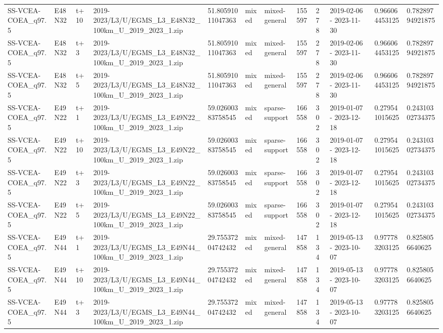 \begin{landscape}
\begin{longtable}{llllllllllll}
SS-VCEA-COEA\_q97.5 & E48N32 & t+10 & 2019-2023/L3/U/EGMS\_L3\_E48N32\_100km\_U\_2019\_2023\_1.zip & 51.80591011047363 & mixed & mixed-general & 155597 & 278 & 2019-02-06 - 2023-11-30 & 0.966064453125 & 0.78289794921875 \\
SS-VCEA-COEA\_q97.5 & E48N32 & t+3 & 2019-2023/L3/U/EGMS\_L3\_E48N32\_100km\_U\_2019\_2023\_1.zip & 51.80591011047363 & mixed & mixed-general & 155597 & 278 & 2019-02-06 - 2023-11-30 & 0.966064453125 & 0.78289794921875 \\
SS-VCEA-COEA\_q97.5 & E48N32 & t+5 & 2019-2023/L3/U/EGMS\_L3\_E48N32\_100km\_U\_2019\_2023\_1.zip & 51.80591011047363 & mixed & mixed-general & 155597 & 278 & 2019-02-06 - 2023-11-30 & 0.966064453125 & 0.78289794921875 \\
SS-VCEA-COEA\_q97.5 & E49N22 & t+1 & 2019-2023/L3/U/EGMS\_L3\_E49N22\_100km\_U\_2019\_2023\_1.zip & 59.02600383758545 & mixed & sparse-support & 166558 & 302 & 2019-01-07 - 2023-12-18 & 0.279541015625 & 0.24310302734375 \\
SS-VCEA-COEA\_q97.5 & E49N22 & t+10 & 2019-2023/L3/U/EGMS\_L3\_E49N22\_100km\_U\_2019\_2023\_1.zip & 59.02600383758545 & mixed & sparse-support & 166558 & 302 & 2019-01-07 - 2023-12-18 & 0.279541015625 & 0.24310302734375 \\
SS-VCEA-COEA\_q97.5 & E49N22 & t+3 & 2019-2023/L3/U/EGMS\_L3\_E49N22\_100km\_U\_2019\_2023\_1.zip & 59.02600383758545 & mixed & sparse-support & 166558 & 302 & 2019-01-07 - 2023-12-18 & 0.279541015625 & 0.24310302734375 \\
SS-VCEA-COEA\_q97.5 & E49N22 & t+5 & 2019-2023/L3/U/EGMS\_L3\_E49N22\_100km\_U\_2019\_2023\_1.zip & 59.02600383758545 & mixed & sparse-support & 166558 & 302 & 2019-01-07 - 2023-12-18 & 0.279541015625 & 0.24310302734375 \\
SS-VCEA-COEA\_q97.5 & E49N44 & t+1 & 2019-2023/L3/U/EGMS\_L3\_E49N44\_100km\_U\_2019\_2023\_1.zip & 29.75537204742432 & mixed & mixed-general & 147858 & 134 & 2019-05-13 - 2023-10-07 & 0.977783203125 & 0.8258056640625 \\
SS-VCEA-COEA\_q97.5 & E49N44 & t+10 & 2019-2023/L3/U/EGMS\_L3\_E49N44\_100km\_U\_2019\_2023\_1.zip & 29.75537204742432 & mixed & mixed-general & 147858 & 134 & 2019-05-13 - 2023-10-07 & 0.977783203125 & 0.8258056640625 \\
SS-VCEA-COEA\_q97.5 & E49N44 & t+3 & 2019-2023/L3/U/EGMS\_L3\_E49N44\_100km\_U\_2019\_2023\_1.zip & 29.75537204742432 & mixed & mixed-general & 147858 & 134 & 2019-05-13 - 2023-10-07 & 0.977783203125 & 0.8258056640625 \\

\end{longtable}
\end{landscape}
